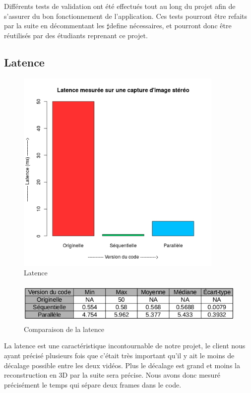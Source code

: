 Différents tests de validation ont été effectués tout au long du projet afin de s'assurer du bon fonctionnement de l'application. Ces tests pourront être refaits par la suite en décommentant les $\sharp$define nécessaires, et pourront donc être réutilisés par des étudiants reprenant ce projet.

\subsection{Latence}

\begin{figure}[!h]
\centering
\includegraphics[width=\textwidth, height=10cm]{Modules/Picture/latence.png}
\caption{Latence}
\label{latence}
\end{figure}

\begin{figure}[!h]
\centering
\includegraphics[width=\textwidth, height=2cm]{Modules/Picture/tableauLatence.png}
\caption{Comparaison de la latence}
\end{figure}

\newpage

La latence est une caractéristique incontournable de notre projet, le client nous ayant précisé plusieurs fois que c'était très important qu'il y ait le moins de décalage possible entre les deux vidéos. Plus le décalage est grand et moins la reconstruction en 3D par la suite sera précise. Nous avons donc mesuré précisément le temps qui sépare deux frames dans le code. 

